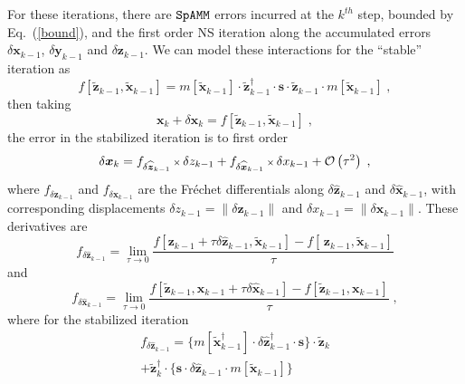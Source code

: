 \documentclass[letterpaper,twocolumn,amsmath,amsfont,amssymb,english,aps,jcp,preprintnumbers,groupaddress,nofootinbib,tightenlines]{revtex4}
\newcommand{\mat}[1]{\boldsymbol{#1}}
\newcommand{\mmat}[1]{\widetilde{\boldsymbol{#1}}}
\begin{document}
For these iterations, there are $\tt SpAMM$ errors incurred at the $k^{th}$ step,  bounded by Eq.~(\ref{bound}),
and the first order NS iteration along the accumulated errors 
$\delta \mat{x}_{k-1}$,  $\delta \mat{y}_{k-1}$  and $\delta \mat{z}_{k-1}$.  We can model these interactions for the ``stable'' iteration as
\begin{equation}
f \left[\widetilde{\mat{z}}_{k-1} , \widetilde{\mat{x}}_{k-1} \right] =
m \left[ \widetilde{\mat{x}}_{k-1}\right] \cdot \widetilde{\mat{z}}^\dagger_{k-1}  
\cdot \mat{s} \cdot \widetilde{\mat{z}}_{k-1} \cdot m\left[ \widetilde{\mat{x}}_{k-1} \right] \; ,
\end{equation}
then taking
\begin{equation}
\mat{x}_k + \delta \mat{x}_k = f \left[\widetilde{\mat{z}}_{k-1} , \widetilde{\mat{x}}_{k-1} \right] \;, 
\end{equation}
the error in the stabilized iteration is to first order
\begin{equation}
\delta \mat{x}_k = {f}_{\delta \widehat{\mat{z}}_{k-1}}  \, {\scriptstyle \times} \, \delta z_{k-1} 
                 + {f}_{\delta \widehat{\mat{x}}_{k-1}}  \, {\scriptstyle \times} \, \delta x_{k-1} 
+ {\cal{O}} \left(  \tau^2 \right) \; ,
\end{equation}
where ${f}_{\delta \mat{z}_{k-1}}$ and ${f}_{\delta \mat{x}_{k-1}}$ are the Fr\'{e}chet differentials \cite{} along  
$\delta \widehat{\mat{z}}_{k-1}$ and $\delta \widehat{\mat{x}}_{k-1}$, with corresponding displacements 
$\delta z_{k-1} = \lVert \delta \mat{z}_{k-1} \rVert$  and $\delta x_{k-1}=\lVert \delta \mat{x}_{k-1} \rVert$.  These derivatives are
\begin{equation}
f_{\delta \widehat{\mat{z}}_{k-1}} = \lim_{\tau \rightarrow 0} \frac{ f [ \mat{z}_{k-1} +\tau  \delta \widehat{\mat{z}}_{k-1}, \widetilde{\mat{x}}_{k-1} ]
-f [\, \mat{z}_{k-1}, \widetilde{\mat{x}}_{k-1} ]  }{\tau} 
\end{equation}
and 
\begin{equation}
f_{\delta \widehat{ \mat{x}}_{k-1}} = \lim_{\tau \rightarrow 0} \frac{ f [ \widetilde{\mat{z}}_{k-1}, \mat{x}_{k-1} + \tau \delta \widehat{\mat{x}}_{k-1} ]
-f [ \widetilde{\mat{z}}_{k-1}, \mat{x}_{k-1} ]  }{\tau} \; ,
\end{equation}
where for the stabilized iteration
\begin{multline}
f_{\delta \widehat{\mat{z}}_{k-1}} =
\{ m\left[\mmat{x}^\dagger_{k-1} \right]  \cdot \delta {\widehat{\mat{z}}}^\dagger_{k-1} 
 \cdot \mat{s} \} \cdot \widetilde{\mat{z}}_{k} \\
+\widetilde{\mat{z}}^\dagger_{k} \cdot \{ \mat{s} \cdot \delta {\widehat{\mat{z}}}_{k-1}
\cdot {m}\left[\mmat{x}_{k-1} \right]    \} 
\end{multline}
\end{document}
